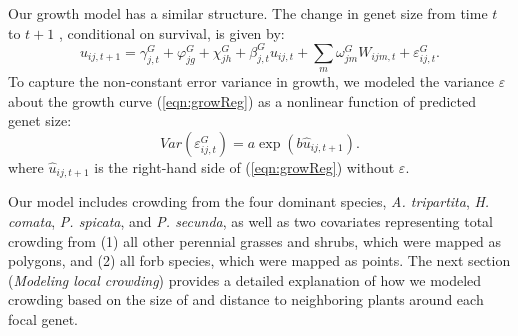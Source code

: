 \documentclass[11pt]{article}
\begin{document}
Our growth model has a similar structure. The change in genet size from time $t$ to $t+1$ , conditional on survival, is given by:
\begin{equation}
u_{ij,t+1} = \gamma_{j,t}^G + \varphi_{jg}^G+  \chi_{jh}^G  + \beta_{j,t}^G u_{ij,t} + 
\sum \limits_{m} \omega_{jm}^G {W}_{ijm,t} + \varepsilon_{ij,t}^G .
\label{eqn:growReg}
\end{equation}
To capture the non-constant error variance in growth, we modeled the variance $\varepsilon$ about the growth 
curve (\ref{eqn:growReg}) as a nonlinear function of predicted genet size:
\begin{equation}
Var(\varepsilon_{ij,t}^G) = a \exp(b\hat{u}_{ij,t+1}).
\label{eqn:growVar}
\end{equation}
where $\hat{u}_{ij,t+1}$ is the right-hand side of (\ref{eqn:growReg}) without $\varepsilon$. 

Our model includes crowding from the four dominant species, \textit{A. tripartita}, \textit{H. comata}, \textit{P. spicata}, and \textit{P. secunda}, as well as two covariates representing total crowding from (1) all other perennial grasses and shrubs, which were mapped as polygons, and (2) all forb species, which were mapped as points. The next section (\textit{Modeling local crowding}) provides a detailed explanation of how we modeled crowding based on the size of and distance to neighboring plants around each focal genet.
\end{document}
